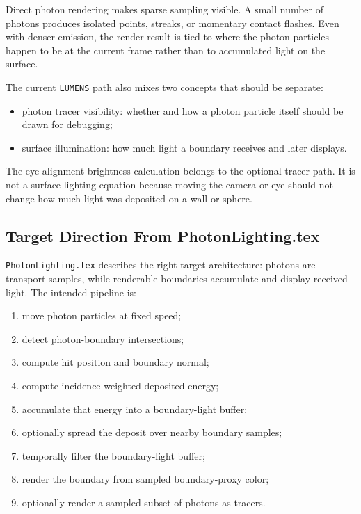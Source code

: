 Direct photon rendering makes sparse sampling visible.  A small number of
photons produces isolated points, streaks, or momentary contact flashes.  Even
with denser emission, the render result is tied to where the photon particles
happen to be at the current frame rather than to accumulated light on the
surface.

The current \texttt{LUMENS} path also mixes two concepts that should be
separate:
\begin{itemize}
    \item photon tracer visibility: whether and how a photon particle itself
          should be drawn for debugging;
    \item surface illumination: how much light a boundary receives and later
          displays.
\end{itemize}

The eye-alignment brightness calculation belongs to the optional tracer path.
It is not a surface-lighting equation because moving the camera or eye should
not change how much light was deposited on a wall or sphere.

\subsection{Target Direction From PhotonLighting.tex}

\texttt{PhotonLighting.tex} describes the right target architecture:
photons are transport samples, while renderable boundaries accumulate and
display received light.  The intended pipeline is:
\begin{enumerate}
    \item move photon particles at fixed speed;
    \item detect photon-boundary intersections;
    \item compute hit position and boundary normal;
    \item compute incidence-weighted deposited energy;
    \item accumulate that energy into a boundary-light buffer;
    \item optionally spread the deposit over nearby boundary samples;
    \item temporally filter the boundary-light buffer;
    \item render the boundary from sampled boundary-proxy color;
    \item optionally render a sampled subset of photons as tracers.
\end{enumerate}


